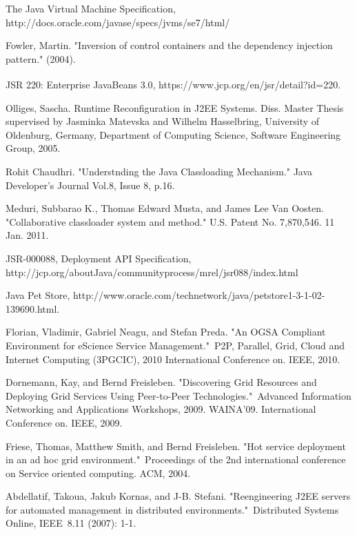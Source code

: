 \documentclass[conference]{IEEEtran}
\begin{document}
\begin{thebibliography}{9}
The Java Virtual Machine Specification, http://docs.oracle.com/javase/specs/jvms/se7/html/

Fowler, Martin. "Inversion of control containers and the dependency injection pattern." (2004).

JSR 220: Enterprise JavaBeans\textsuperscript{\texttrademark} 3.0, https://www.jcp.org/en/jsr/detail?id=220.

Olliges, Sascha. Runtime Reconfiguration in J2EE Systems. Diss. Master Thesis supervised by Jasminka Matevska and Wilhelm Hasselbring, University of Oldenburg, Germany, Department of Computing Science, Software Engineering Group, 2005.

Rohit Chaudhri. "Understnding the Java Classloading Mechanism." Java Developer's Journal Vol.8, Issue 8, p.16.

Meduri, Subbarao K., Thomas Edward Musta, and James Lee Van Oosten. "Collaborative classloader system and method." U.S. Patent No. 7,870,546. 11 Jan. 2011.

JSR-000088, Deployment API Specification, http://jcp.org/aboutJava/communityprocess/mrel/jsr088/index.html

Java Pet Store, http://www.oracle.com/technetwork/java/petstore1-3-1-02-139690.html.


Florian, Vladimir, Gabriel Neagu, and Stefan Preda. "An OGSA Compliant Environment for eScience Service Management." P2P, Parallel, Grid, Cloud and Internet Computing (3PGCIC), 2010 International Conference on. IEEE, 2010.

Dornemann, Kay, and Bernd Freisleben. "Discovering Grid Resources and Deploying Grid Services Using Peer-to-Peer Technologies." Advanced Information Networking and Applications Workshops, 2009. WAINA'09. International Conference on. IEEE, 2009.

Friese, Thomas, Matthew Smith, and Bernd Freisleben. "Hot service deployment in an ad hoc grid environment." Proceedings of the 2nd international conference on Service oriented computing. ACM, 2004.

Abdellatif, Takoua, Jakub Kornas, and J-B. Stefani. "Reengineering J2EE servers for automated management in distributed environments." Distributed Systems Online, IEEE 8.11 (2007): 1-1.


\end{thebibliography}
\end{document}
